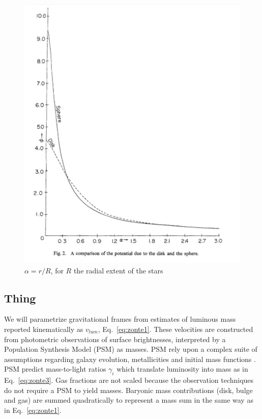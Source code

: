 \documentclass[reprint,%
 amsmath,amssymb,
 aps,
]{revtex4-1}
\begin{document}
\begin{figure}
    \centering
     \includegraphics[width=\linewidth]{Chatterjee_SphereDisk.png}
    \caption{ $\alpha = r/R$, for $R$ the radial extent of the stars \cite{Chatterjee}}
    \label{fig:my_geom}
\end{figure}

  
  \subsection{Thing}
We will parametrize gravitational frames from estimates of luminous mass reported kinematically as  $v_{lum}$, Eq.~\ref{eq:zonte1}. These velocities  are constructed from photometric observations of surface brightnesses, interpreted   by a Population Synthesis Model (PSM)\cite{10.1093/mnras/sty3223} as     masses. 
PSM rely upon a complex  suite of  assumptions regarding galaxy evolution, metallicities and initial mass functions  \cite{BelldYong,10.1093/mnras/sty3223}. PSM predict   mass-to-light ratios  $\gamma_i$
 which translate  luminosity into mass as in Eq.~\ref{eq:zonte3}. 
Gas fractions are  not scaled because the observation techniques do not require a PSM to yield masses.  Baryonic mass contributions (disk, bulge and gas) are summed quadratically to represent a mass sum in the same way as in   Eq.~\ref{eq:zonte1}.
\end{document}
